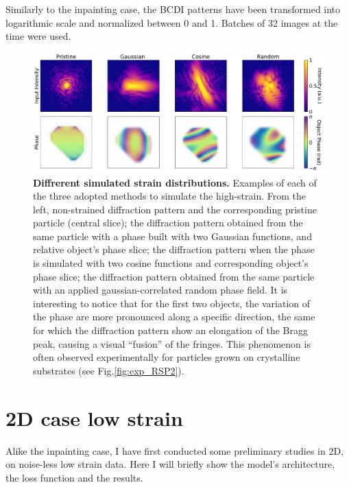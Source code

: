 Similarly to the inpainting case, the BCDI patterns have been transformed into logarithmic scale and normalized between 
0 and 1. Batches of 32 images at the time were used. 

\begin{figure}[H]
    \centering
    \includegraphics[width=\textwidth]{figures/Phasing/strains_creation.pdf}
    \caption{\textbf{Diffrerent simulated strain distributions.}  Examples of each of the three adopted methods to simulate 
    the high-strain. From the left, non-strained diffraction pattern and the corresponding pristine particle (central slice); 
    the diffraction pattern obtained from the same particle with a phase built with two Gaussian functions, and relative 
    object's phase slice; the diffraction pattern when the phase is simulated with two cosine functions and corresponding 
    object's phase slice; the diffraction pattern obtained from the same particle with an applied gaussian-correlated 
    random phase field. It is interesting to notice that for the first two objects, the variation of the phase are 
    more pronounced along a specific direction, the same for which the diffraction pattern show an elongation of the 
    Bragg peak, causing a visual ``fusion'' of the fringes. This phenomenon is often observed experimentally for particles 
    grown on crystalline substrates (see Fig.\ref{fig:exp_RSP2}). }
    \label{fig:strains_creation}
\end{figure}

\section{2D case low strain}\label{chp:2d_nostrain}
Alike the inpainting case, I have first conducted some preliminary studies in 2D, on noise-less low strain data. Here I will 
briefly show the model's architecture, the loss function and the results. 
